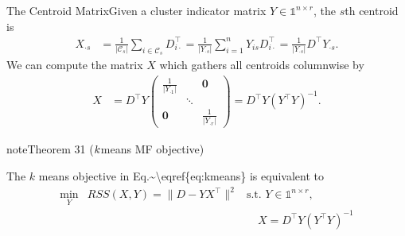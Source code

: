 \documentclass[letterpaper,10pt,english]{jupyterBook}
\begin{document}
\sphinxAtStartPar
The Centroid MatrixGiven a cluster indicator matrix \(Y\in\mathbb{1}^{n\times r}\), the \(s\)th centroid is
\begin{align*}
    X_{\cdot s}&=\frac{1}{|\mathcal{C}_s|}\sum_{i\in\mathcal{C}_s}D_{i\cdot}^\top=\frac{1}{\lvert Y_{\cdot s}\rvert}\sum_{i=1}^nY_{is}D_{i\cdot}^\top 
    = \frac{1}{\lvert Y_{\cdot s}\rvert} D^\top Y_{\cdot s}.
\end{align*}
\sphinxAtStartPar
We can compute the matrix \(X\) which gathers all centroids column\sphinxhyphen{}wise by
\begin{align*}
    X &= D^\top Y 
    \begin{pmatrix}
    \frac{1}{\lvert Y_{\cdot 1}\rvert} & &\mathbf{0}\\
    &\ddots &\\
    \mathbf{0}& & \frac{1}{\lvert Y_{\cdot r}\rvert}
    \end{pmatrix} 
    = D^\top Y (Y^\top Y)^{-1}.
\end{align*}\label{clustering_k_means_mf:theorem-0}
\begin{sphinxadmonition}{note}{Theorem 31 (\protect\(k\protect\)\sphinxhyphen{}means MF objective)}



\sphinxAtStartPar
The \(k\)\sphinxhyphen{} means objective in Eq.\textasciitilde{}\textbackslash{}eqref\{eq:k\sphinxhyphen{}means\} is equivalent to
\begin{align*}
    \min_Y& RSS(X,Y) = \lVert D-YX^\top\rVert^2
    &\text{s.t. }Y\in\mathbb{1}^{n\times r},\\ 
    &&\quad X=D^\top Y (Y^\top Y)^{-1}
\end{align*}\end{sphinxadmonition}
\end{document}
